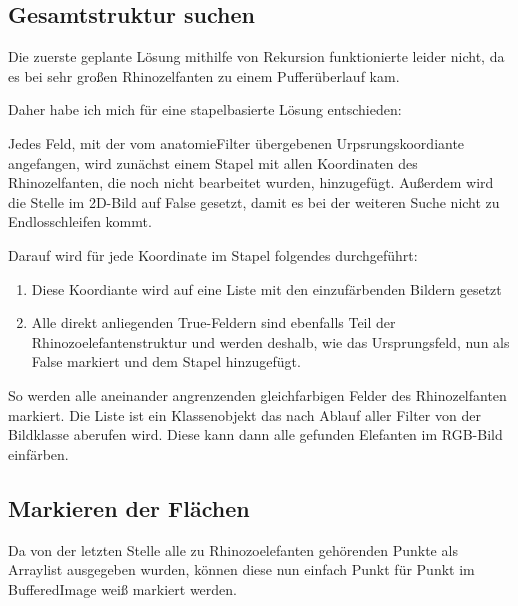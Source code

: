 	\subsection {Gesamtstruktur suchen}
	Die zuerste geplante Lösung mithilfe von Rekursion funktionierte leider nicht, da es bei sehr großen Rhinozelfanten zu einem Pufferüberlauf kam.

	Daher habe ich mich für eine stapelbasierte Lösung entschieden:

	Jedes Feld, mit der vom anatomieFilter übergebenen Urpsrungskoordiante angefangen, wird zunächst einem Stapel mit allen Koordinaten des Rhinozelfanten, die noch nicht bearbeitet wurden, hinzugefügt. Außerdem wird die Stelle im 2D-Bild auf False gesetzt, damit es bei der weiteren Suche nicht zu Endlosschleifen kommt.

	Darauf wird für jede Koordinate im Stapel folgendes durchgeführt:

	\begin{enumerate}
		\item Diese Koordiante wird auf eine Liste mit den einzufärbenden Bildern gesetzt
		\item Alle direkt anliegenden True-Feldern sind ebenfalls Teil der Rhinozoelefantenstruktur und werden deshalb, wie das Ursprungsfeld, nun als False markiert und dem Stapel hinzugefügt.
	\end{enumerate}

	So werden alle aneinander angrenzenden gleichfarbigen Felder des Rhinozelfanten markiert. Die Liste ist ein Klassenobjekt das nach Ablauf aller Filter von der Bildklasse aberufen wird. Diese kann dann alle gefunden Elefanten im RGB-Bild einfärben.

	\subsection {Markieren der Flächen}

	Da von der letzten Stelle alle zu Rhinozoelefanten gehörenden Punkte als Arraylist ausgegeben wurden, können diese nun einfach Punkt für Punkt im BufferedImage weiß markiert werden.